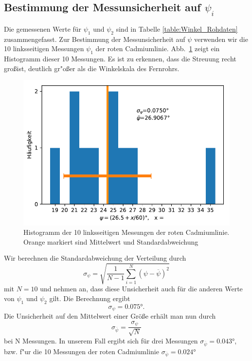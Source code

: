 \documentclass[12pt,a4paper]{article}
\begin{document}
\subsection{Bestimmung der Messunsicherheit auf  $\psi_i$}
Die gemessenen Werte für $\psi_{1}$ und $\psi_2$ sind in Tabelle \ref{table:Winkel_Rohdaten} zusammengefasst. Zur Bestimmung der Messunsicherheit auf $\psi$ verwenden wir die 10 linksseitigen Messungen $\psi_1$ der roten Cadmiumlinie. Abb.~\ref{Histogramm} zeigt ein Histogramm dieser 10 Messungen. Es ist zu erkennen, dass die Streuung recht gro\ss  ist, deutlich gr"o\ss er als die Winkelskala des Fernrohrs.
\begin{figure}[H]
	\centering
	\includegraphics[width=0.8\linewidth]{Python/Histogramm_Psi.pdf}
	\caption{Histogramm der 10 linksseitigen Messungen der roten Cadmiumlinie. Orange markiert sind Mittelwert und Standardabweichung}
	\label{Histogramm}
\end{figure}
Wir berechnen die Standardabweichung der Verteilung durch
\begin{equation}
\sigma_{\psi}=\sqrt{\frac{1}{N-1}\sum^{N}_{i=1}{(\psi-\overline{\psi})^2}}
\end{equation}
mit $N=10$ und nehmen an, dass diese Unsicherheit auch für die anderen Werte von $\psi_1$ und $\psi_2$ gilt. Die Berechnung ergibt
\begin{equation}
\sigma_{\psi}=\ang{0.075}.
\end{equation}
Die Unsicherheit auf den Mittelwert einer Größe erhält man nun durch
\begin{equation}
\sigma_{\overline{\psi}}=\frac{\sigma_{\psi}}{\sqrt{N}}
\end{equation}
bei N Messungen.  In unserem Fall ergibt sich für drei Messungen $\sigma_{\overline{\psi}}=\ang{0.043}$, bzw. f"ur die 10 Messungen der roten Cadmiumlinie $\sigma_{\overline{\psi}}=\ang{0.024}$
\end{document}
